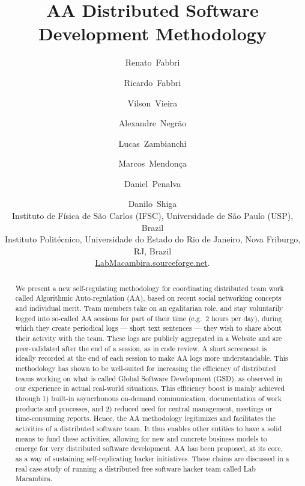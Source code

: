 \title{
AA Distributed Software Development Methodology
}

\author{%
Renato~Fabbri \and Ricardo~Fabbri \and Vilson~Vieira \and Alexandre~Negr\~{a}o \and Lucas~Zambianchi
\and Marcos~Mendon\c{c}a \and Daniel~Penalva \and Danilo~Shiga\\[1em]
\small{
Instituto de F\'{i}sica de S\~{a}o Carlos (IFSC), Universidade de
S\~{a}o Paulo (USP), Brazil}\\[0.5em]
\small{Instituto Polit\'{e}cnico, Universidade do Estado do Rio de
Janeiro, Nova Friburgo, RJ, Brazil}\\[0.5em]
\url{LabMacambira.sourceforge.net}.
}


\maketitle

\begin{abstract}
We present a new self-regulating methodology for coordinating distributed team
work called Algorithmic Auto-regulation (AA), based on recent social networking
concepts and individual merit. Team members take on an egalitarian role, and
stay voluntarily logged into so-called AA sessions for part of their time (e.g.\
2 hours per day), during which they create periodical logs --- short text
sentences --- they wish to share about their activity with the team. These logs
are publicly aggregated in a Website and are peer-validated after the end of a
session, as in code review.  A short screencast is ideally recorded at the end
of each session to make AA logs more understandable.  This methodology has shown
to be well-suited for increasing the efficiency of distributed teams working on
what is called Global Software Development (GSD), as observed in our experience
in actual real-world situations.  This efficiency boost is mainly achieved through 1)
built-in asyncrhonous on-demand communication, documentation of work products
and processes, and 2) reduced need for central management, meetings or
time-consuming reports. Hence, the AA methodology legitimizes and facilitates
the activities of a distributed software team.  It thus enables other entities
to have a solid means to fund these activities, allowing for new and concrete
business models to emerge for very distributed software development. AA has been
proposed, at its core, as a way of sustaining self-replicating hacker
initiatives. These claims are discussed in a real case-study of running a
distributed free software hacker team called Lab Macambira.  
\end{abstract}
